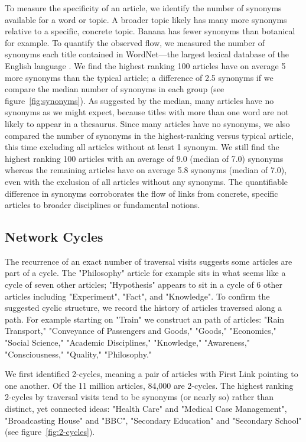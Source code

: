 \documentclass[pre,twocolumn,twoside,superscriptaddress,floatfix, aps, 10pt]{revtex4-1}
\begin{document}
To measure the specificity of an article, we identify the number of synonyms available for a word or topic. 
A  broader topic likely has many more synonyms relative to a specific, concrete topic. 
Banana has fewer synonyms than botanical for example. 
To quantify the observed flow, we measured the number of synonyms each title contained in WordNet---the largest lexical database of the English language 
\cite{wordnet}. 
We find the highest ranking 100 articles have on average 5 more synonyms than the typical article; a difference of 2.5 synonyms if we compare the median number of synonyms in each group
(see figure~\ref{fig:synonyms}). 
As suggested by the median, many articles have no synonyms as we might expect, because titles with more than one word are not likely to appear in a thesaurus. 
Since many articles have no synonyms, we also compared the number of synonyms in the highest-ranking versus typical article, this time excluding all articles without at least 1 synonym. 
We still find the highest ranking 100 articles with an average of 9.0 (median of 7.0) synonyms whereas the remaining articles have on average 5.8 synonyms (median of 7.0), even with the exclusion of all articles without any synonyms.
The quantifiable difference in synonyms corroborates the flow of links from concrete, specific articles to broader disciplines or fundamental notions.



\subsection{Network Cycles}

The recurrence of an exact number of traversal visits suggests some articles are part of a cycle. 
The "Philosophy" article for example sits in what seems like a cycle of seven other articles; "Hypothesis" appears to sit in a 
cycle of 6 other articles including "Experiment", "Fact", and "Knowledge".
To confirm the suggested cyclic structure, we record the history of articles traversed along a path. For example starting on "Train" we construct an path of articles: 
"Rain Transport,"
"Conveyance of Passengers and Goods," 
"Goods," 
"Economics,"
"Social Science,"
"Academic Disciplines,"
"Knowledge,"
"Awareness,"
"Consciousness,"
"Quality,"
"Philosophy."

We first identified 2-cycles, meaning a pair of articles with First Link pointing to one another.
Of the 11 million articles, 84,000 are 2-cycles. 
The highest ranking 2-cycles by traversal visits tend to be synonyms (or nearly so) rather than distinct, yet connected ideas:
"Health Care" and "Medical Case Management", "Broadcasting House" and "BBC", "Secondary Education" and "Secondary School" 
(see figure~\ref{fig:2-cycles}).
\end{document}
